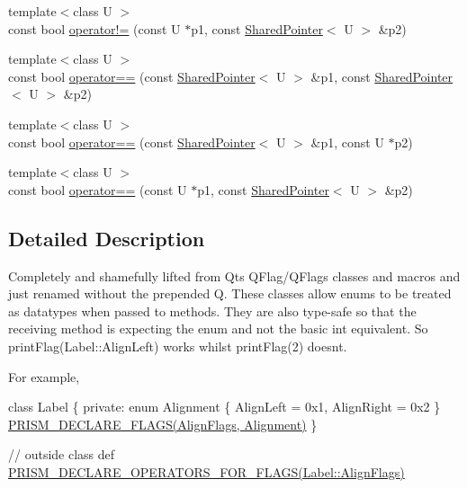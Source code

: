 \begin{DoxyCompactItemize}
\item 
{\footnotesize template$<$class U $>$ }\\const bool \hyperlink{namespaceprism_ab8792dbd5cac5678390843bacdb69daa}{operator!=} (const U $\ast$p1, const \hyperlink{classprism_1_1_shared_pointer}{Shared\+Pointer}$<$ U $>$ \&p2)
\item 
{\footnotesize template$<$class U $>$ }\\const bool \hyperlink{namespaceprism_ae53d52e8a36ec7ca58ea1731cc18f1d8}{operator==} (const \hyperlink{classprism_1_1_shared_pointer}{Shared\+Pointer}$<$ U $>$ \&p1, const \hyperlink{classprism_1_1_shared_pointer}{Shared\+Pointer}$<$ U $>$ \&p2)
\item 
{\footnotesize template$<$class U $>$ }\\const bool \hyperlink{namespaceprism_a2b73e87f080646696ed6b595a3900119}{operator==} (const \hyperlink{classprism_1_1_shared_pointer}{Shared\+Pointer}$<$ U $>$ \&p1, const U $\ast$p2)
\item 
{\footnotesize template$<$class U $>$ }\\const bool \hyperlink{namespaceprism_a1f29b22985dc0ec1fc548a551ce313ed}{operator==} (const U $\ast$p1, const \hyperlink{classprism_1_1_shared_pointer}{Shared\+Pointer}$<$ U $>$ \&p2)
\end{DoxyCompactItemize}


\subsection{Detailed Description}
Completely and shamefully lifted from Qt\textquotesingle{}s Q\+Flag/\+Q\+Flags classes and macros and just renamed without the prepended \textquotesingle{}Q\textquotesingle{}. These classes allow enums to be treated as datatypes when passed to methods. They are also type-\/safe so that the receiving method is expecting the enum and not the basic int equivalent. So print\+Flag(\+Label\+::\+Align\+Left) works whilst print\+Flag(2) doesn\textquotesingle{}t.

For example,

class Label \{ private\+: enum Alignment \{ Align\+Left = 0x1, Align\+Right = 0x2 \} \hyperlink{_flags_8h_aa5aa2c9827ab949836e20999b9a068ec}{P\+R\+I\+S\+M\+\_\+\+D\+E\+C\+L\+A\+R\+E\+\_\+\+F\+L\+A\+G\+S(\+Align\+Flags, Alignment)} \}

// outside class def \hyperlink{_flags_8h_ae8aabb683a18b872a4449769b82e8e15}{P\+R\+I\+S\+M\+\_\+\+D\+E\+C\+L\+A\+R\+E\+\_\+\+O\+P\+E\+R\+A\+T\+O\+R\+S\+\_\+\+F\+O\+R\+\_\+\+F\+L\+A\+G\+S(\+Label\+::\+Align\+Flags)}

